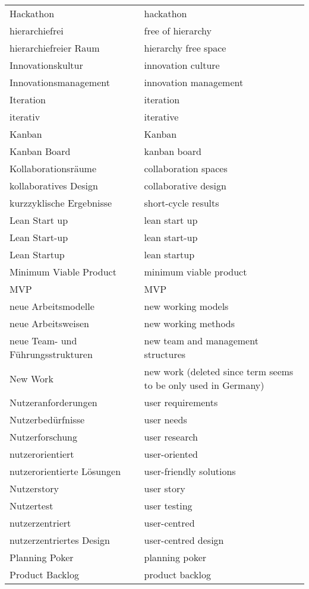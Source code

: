 \begin{spacing}{.5}
\begin{longtable}{ p{} p{}}
    Hackathon & hackathon \\
    hierarchiefrei & free of hierarchy \\
    hierarchiefreier Raum & hierarchy free space \\
    Innovationskultur & innovation culture \\
    Innovationsmanagement & innovation management \\
    Iteration & iteration \\
    iterativ & iterative \\
    Kanban & Kanban \\
    Kanban Board & kanban board \\
    Kollaborationsräume & collaboration spaces \\
    kollaboratives Design & collaborative design \\
    kurzzyklische Ergebnisse & short-cycle results \\
    Lean Start up & lean start up \\
    Lean Start-up & lean start-up \\
    Lean Startup & lean startup \\
    Minimum Viable Product & minimum viable product \\
    MVP & MVP \\
    neue Arbeitsmodelle & new working models \\
    neue Arbeitsweisen & new working methods \\
    neue Team- und Führungsstrukturen & new team and management structures \\
    New Work & new work (deleted since term seems to be only used in Germany)\\
    Nutzeranforderungen & user requirements \\
    Nutzerbedürfnisse & user needs \\
    Nutzerforschung & user research \\
    nutzerorientiert & user-oriented \\
    nutzerorientierte Lösungen & user-friendly solutions \\
    Nutzerstory & user story \\
    Nutzertest & user testing \\
    nutzerzentriert & user-centred \\
    nutzerzentriertes Design & user-centred design \\
    Planning Poker & planning poker \\
    Product Backlog & product backlog \\

\end{longtable}
\end{spacing}
